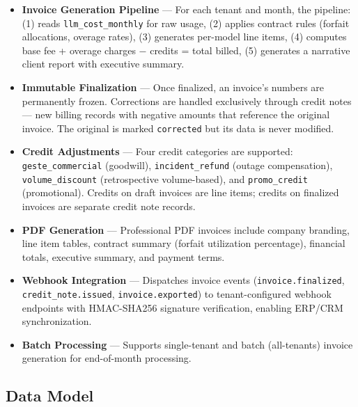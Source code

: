 \documentclass[12pt,a4paper,twoside]{report}
\begin{document}
\begin{itemize}
  \item \textbf{Invoice Generation Pipeline} — For each tenant and month, the pipeline: (1) reads \texttt{llm\_cost\_monthly} for raw usage, (2) applies contract rules (forfait allocations, overage rates), (3) generates per-model line items, (4) computes base fee + overage charges $-$ credits = total billed, (5) generates a narrative client report with executive summary.

  \item \textbf{Immutable Finalization} — Once finalized, an invoice's numbers are permanently frozen. Corrections are handled exclusively through credit notes — new billing records with negative amounts that reference the original invoice. The original is marked \texttt{corrected} but its data is never modified.

  \item \textbf{Credit Adjustments} — Four credit categories are supported: \texttt{geste\_commercial} (goodwill), \texttt{incident\_refund} (outage compensation), \texttt{volume\_discount} (retrospective volume-based), and \texttt{promo\_credit} (promotional). Credits on draft invoices are line items; credits on finalized invoices are separate credit note records.

  \item \textbf{PDF Generation} — Professional PDF invoices include company branding, line item tables, contract summary (forfait utilization percentage), financial totals, executive summary, and payment terms.

  \item \textbf{Webhook Integration} — Dispatches invoice events (\texttt{invoice.finalized}, \texttt{credit\_note.issued}, \texttt{invoice.exported}) to tenant-configured webhook endpoints with HMAC-SHA256 signature verification, enabling ERP/CRM synchronization.

  \item \textbf{Batch Processing} — Supports single-tenant and batch (all-tenants) invoice generation for end-of-month processing.
\end{itemize}

\subsection{Data Model}
\end{document}
